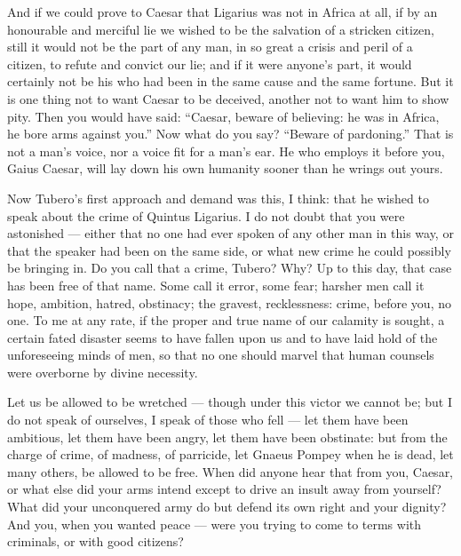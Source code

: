  And if we could prove to Caesar that Ligarius was not in Africa at all, if by an honourable and merciful lie we wished to be the salvation of a stricken citizen, still it would not be the part of any man, in so great a crisis and peril of a citizen, to refute and convict our lie; and if it were anyone's part, it would certainly not be his who had been in the same cause and the same fortune. But it is one thing not to want Caesar to be deceived, another not to want him to show pity. Then you would have said: ``Caesar, beware of believing: he was in Africa, he bore arms against you.'' Now what do you say? ``Beware of pardoning.'' That is not a man's voice, nor a voice fit for a man's ear. He who employs it before you, Gaius Caesar, will lay down his own humanity sooner than he wrings out yours.

 Now Tubero's first approach and demand was this, I think: that he wished to speak about the crime of Quintus Ligarius. I do not doubt that you were astonished --- either that no one had ever spoken of any other man in this way, or that the speaker had been on the same side, or what new crime he could possibly be bringing in. Do you call that a crime, Tubero? Why? Up to this day, that case has been free of that name. Some call it error, some fear; harsher men call it hope, ambition, hatred, obstinacy; the gravest, recklessness: crime, before you, no one. To me at any rate, if the proper and true name of our calamity is sought, a certain fated disaster seems to have fallen upon us and to have laid hold of the unforeseeing minds of men, so that no one should marvel that human counsels were overborne by divine necessity.

 Let us be allowed to be wretched --- though under this victor we cannot be; but I do not speak of ourselves, I speak of those who fell --- let them have been ambitious, let them have been angry, let them have been obstinate: but from the charge of crime, of madness, of parricide, let Gnaeus Pompey when he is dead, let many others, be allowed to be free. When did anyone hear that from you, Caesar, or what else did your arms intend except to drive an insult away from yourself? What did your unconquered army do but defend its own right and your dignity? And you, when you wanted peace --- were you trying to come to terms with criminals, or with good citizens?

